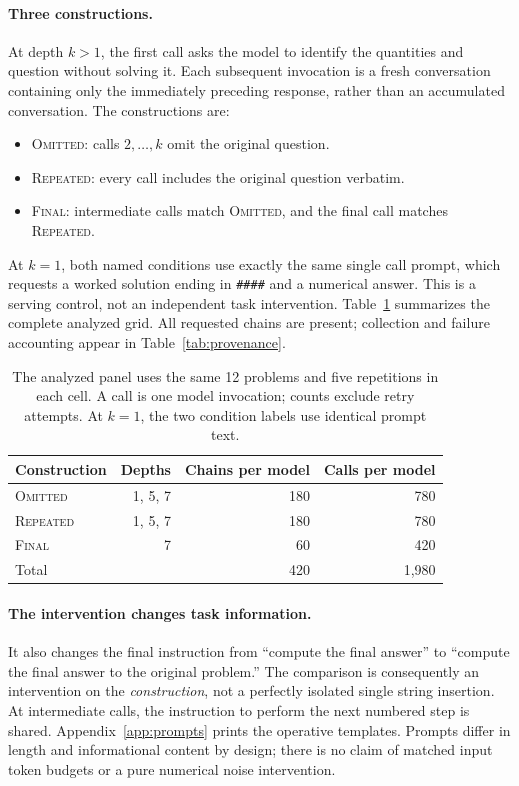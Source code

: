 \documentclass{article}
\newcommand{\dropq}{\textsc{Omitted}}
\newcommand{\fixed}{\textsc{Repeated}}
\newcommand{\finalonly}{\textsc{Final}}
\begin{document}
\paragraph{Three constructions.}
At depth $k>1$, the first call asks the model to identify the quantities and question without solving it. Each subsequent invocation is a fresh conversation containing only the immediately preceding response, rather than an accumulated conversation. The constructions are:
\begin{itemize}
\item \dropq: calls $2,\ldots,k$ omit the original question.
\item \fixed: every call includes the original question verbatim.
\item \finalonly: intermediate calls match \dropq, and the final call matches \fixed.
\end{itemize}
At $k=1$, both named conditions use exactly the same single call prompt, which requests a worked solution ending in \texttt{\#\#\#\#} and a numerical answer. This is a serving control, not an independent task intervention. Table~\ref{tab:design} summarizes the complete analyzed grid. All requested chains are present; collection and failure accounting appear in Table~\ref{tab:provenance}.

\begin{table}[t]
\centering
\caption{The analyzed panel uses the same 12 problems and five repetitions in each cell. A call is one model invocation; counts exclude retry attempts. At $k=1$, the two condition labels use identical prompt text.}
\label{tab:design}
\begin{tabular}{lrrr}
\toprule
Construction & Depths & Chains per model & Calls per model\\
\midrule
\dropq & 1, 5, 7 & 180 & 780\\
\fixed & 1, 5, 7 & 180 & 780\\
\finalonly & 7 & 60 & 420\\
\midrule
Total & & 420 & 1,980\\
\bottomrule
\end{tabular}
\end{table}

\paragraph{The intervention changes task information.}
It also changes the final instruction from ``compute the final answer'' to ``compute the final answer to the original problem.'' The comparison is consequently an intervention on the \emph{construction}, not a perfectly isolated single string insertion. At intermediate calls, the instruction to perform the next numbered step is shared. Appendix~\ref{app:prompts} prints the operative templates. Prompts differ in length and informational content by design; there is no claim of matched input token budgets or a pure numerical noise intervention.
\end{document}
